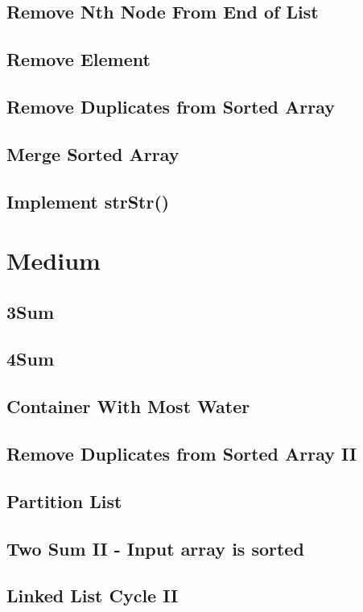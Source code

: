 \documentclass[12pt]{book}
\begin{document}
\subsection{Remove Nth Node From End of List}
\label{sec-15-1-2}
\subsection{Remove Element}
\label{sec-15-1-3}
\subsection{Remove Duplicates from Sorted Array}
\label{sec-15-1-4}
\subsection{Merge Sorted Array}
\label{sec-15-1-5}
\subsection{Implement strStr()}
\label{sec-15-1-6}
\section{Medium}
\label{sec-15-2}
\subsection{3Sum}
\label{sec-15-2-1}
\subsection{4Sum}
\label{sec-15-2-2}
\subsection{Container With Most Water}
\label{sec-15-2-3}
\subsection{Remove Duplicates from Sorted Array II}
\label{sec-15-2-4}
\subsection{Partition List}
\label{sec-15-2-5}
\subsection{Two Sum II - Input array is sorted}
\label{sec-15-2-6}
\subsection{Linked List Cycle II}
\label{sec-15-2-7}
\end{document}
